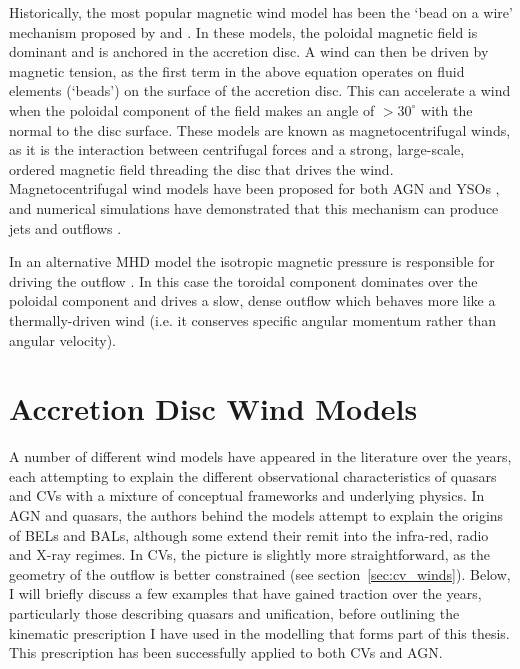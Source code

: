 Historically, the most popular magnetic wind model has been 
the `bead on a wire' mechanism proposed by \cite{blandfordpayne} and 
\cite{pelletier_pudritz}. In these models, 
the poloidal magnetic field is dominant and is anchored in the 
accretion disc. A wind can then be driven by magnetic tension, as the
first term in the above equation operates on fluid elements (`beads') 
on the surface of the accretion disc. This can accelerate
a wind when the poloidal component of the field makes an angle of 
$>30^\circ$ with the normal to the disc surface. These models
are known as magnetocentrifugal winds, as it is the interaction between
centrifugal forces and a strong, large-scale, ordered magnetic field 
threading the disc that drives the wind. 
Magnetocentrifugal wind models have been proposed for both
AGN and YSOs \citep{pelletier_pudritz,konigl1994,kudoh1997},
and numerical simulations have demonstrated that this mechanism can produce
jets and outflows \citep{romanova1997,ouyed1997,ustygova1999}.

In an alternative MHD model the isotropic magnetic pressure 
is responsible for driving the outflow \citep{proga2003a}.
In this case the toroidal component dominates over the poloidal component
and drives a slow, dense outflow which behaves more like a thermally-driven wind 
(i.e. it conserves specific angular momentum rather than angular velocity). 

\section{Accretion Disc Wind Models}
\label{sec:wind_models}

A number of different wind models have appeared in the literature over the 
years, each attempting to explain the different observational characteristics
of quasars and CVs with a mixture of conceptual frameworks and underlying physics.
In AGN and quasars, the authors behind the models attempt to explain the origins of 
BELs and BALs, although some extend their remit into the infra-red, 
radio and X-ray regimes. In CVs, the picture is slightly more straightforward, as 
the geometry of the outflow is better constrained (see section~\ref{sec:cv_winds}).
Below, I will briefly discuss a few examples that have gained traction over the years,
particularly those describing quasars and unification,
before outlining the kinematic prescription I have used in the modelling that forms 
part of this thesis. This prescription has been successfully applied to both CVs 
and AGN. 

